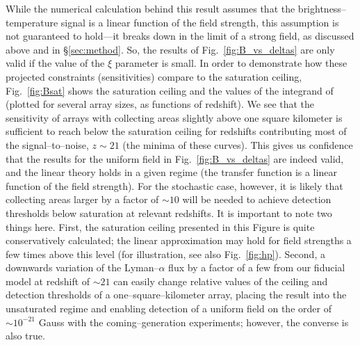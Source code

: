 While the numerical calculation behind this result assumes that the brightness--temperature signal is a linear function of the field strength, this assumption is not guaranteed to hold---it breaks down in the limit of a strong field, as discussed above and in \S\ref{sec:method}. So, the results of Fig.~\ref{fig:B_vs_deltas} are only valid if the value of the $\xi$ parameter is small. In order to demonstrate how these projected constraints (sensitivities) compare to the saturation ceiling, Fig.~\ref{fig:Bsat} shows the saturation ceiling and the values of the integrand of \eq{\ref{eq:fisher_patch}} (plotted for several array sizes, as functions of redshift). We see that the sensitivity of arrays with collecting areas slightly above one square kilometer is sufficient to reach below the saturation ceiling for redshifts contributing most of the signal--to--noise, $z\sim21$ (the minima of these curves). This gives us confidence that the results for the uniform field in Fig.~\ref{fig:B_vs_deltas} are indeed valid, and the linear theory holds in a given regime (the transfer function is a linear function of the field strength). For the stochastic case, however, it is likely that collecting areas larger by a factor of $\sim 10$ will be needed to achieve detection thresholds below saturation at relevant redshifts. It is important to note two things here. First, the saturation ceiling presented in this Figure is quite conservatively calculated; the linear approximation may hold for field strengths a few times above this level (for illustration, see also Fig.~\ref{fig:hp}). Second, a downwards variation of the Lyman--$\alpha$ flux by a factor of a few from our fiducial model at redshift of $\sim 21$ can easily change relative values of the ceiling and detection thresholds of a one--square--kilometer array, placing the result into the unsaturated regime and enabling detection of a uniform field on the order of $\sim 10^{-21}$ Gauss with the coming--generation experiments; however, the converse is also true. 
